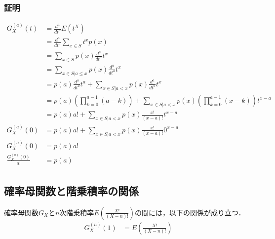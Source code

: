 \documentclass[dvipdfmx]{jsarticle}
\begin{document}
 \subsubsection{証明}
 \begin{align}
  G_X^{\left(a\right)}\left(t\right)&=\frac{d^a}{dt^a}E\left(t^X\right)\nonumber\\
  &=\frac{d^a}{dt^a}\sum_{x\in S}t^xp\left(x\right)\nonumber\\
  &=\sum_{x\in S}p\left(x\right)\frac{d^a}{dt^a}t^x\nonumber\\
  &=\sum_{x\in S|a\le x}p\left(x\right)\frac{d^a}{dt^a}t^x\nonumber\\
  &=p\left(a\right)\frac{d^a}{dt^a}t^a+\sum_{x\in S|a<x}p\left(x\right)\frac{d^a}{dt^a}t^x\nonumber\\
  &=p\left(a\right)\left(\prod_{k=0}^{a-1}\left(a-k\right)\right)+\sum_{x\in S|a<x}p\left(x\right)\left(\prod_{k=0}^{a-1}\left(x-k\right)\right)t^{x-a}\nonumber\\
  &=p\left(a\right)a!+\sum_{x\in S|a<x}p\left(x\right)\frac{x!}{\left(x-a\right)!}t^{x-a}\nonumber\\
  G_X^{\left(a\right)}\left(0\right)&=p\left(a\right)a!+\sum_{x\in S|a<x}p\left(x\right)\frac{x!}{\left(x-a\right)!}0^{x-a}\nonumber\\
  G_X^{\left(a\right)}\left(0\right)&=p\left(a\right)a!\nonumber\\
  \frac{G_X^{\left(a\right)}\left(0\right)}{a!}&=p\left(a\right)\nonumber\\
 \end{align}
 \subsection{確率母関数と階乗積率の関係}
確率母関数$G_X$と$n$次階乗積率$E\left(\frac{X!}{\left(X-n\right)!}\right)$の間には，以下の関係が成り立つ．
 \begin{align}
  G_X^{\left(n\right)}\left(1\right)&=E\left(\frac{X!}{\left(X-n\right)!}\right)
 \end{align}
\end{document}
